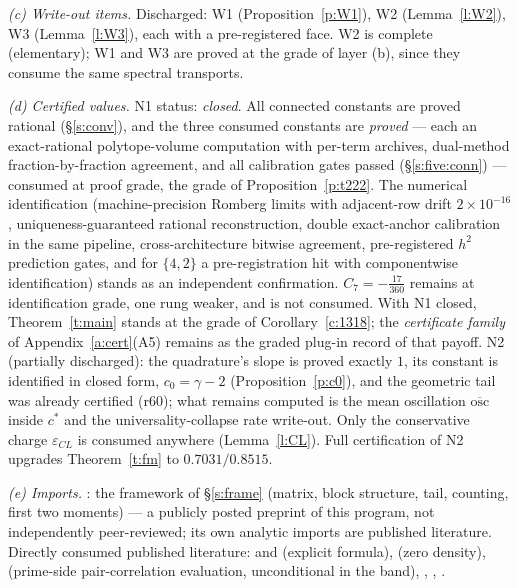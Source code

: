 \documentclass[11pt]{article}
\numberwithin{equation}{section}
\theoremstyle{definition}
\theoremstyle{remark}
\begin{document}
\emph{(c) Write-out items.} Discharged:
W1 (Proposition~\ref{p:W1}), W2 (Lemma~\ref{l:W2}), W3
(Lemma~\ref{l:W3}), each with a pre-registered face. W2 is
complete (elementary); W1 and W3 are proved at the grade of
layer (b), since they consume the same spectral transports.

\emph{(d) Certified values.} N1 status: \emph{closed}. All
connected constants are proved rational (\S\ref{s:conv}), and
the three consumed constants are \emph{proved} --- each an
exact-rational polytope-volume computation with per-term
archives, dual-method fraction-by-fraction agreement, and all
calibration gates passed (\S\ref{s:five:conn}) --- consumed
at proof grade, the grade of Proposition~\ref{p:t222}. The
numerical identification (machine-precision Romberg limits
with adjacent-row drift $2\times10^{-16}$,
uniqueness-guaranteed rational reconstruction, double
exact-anchor calibration in the same pipeline,
cross-architecture bitwise agreement, pre-registered $h^{2}$
prediction gates, and for $\{4,2\}$ a pre-registration hit
with componentwise identification) stands as an independent
confirmation.
$C_7=-\tfrac{17}{360}$ remains at identification grade, one
rung weaker, and is not consumed. With N1 closed,
Theorem~\ref{t:main} stands at the grade of
Corollary~\ref{c:1318}; the \emph{certificate family} of
Appendix~\ref{a:cert}(A5) remains as the graded plug-in
record of that payoff. N2
(partially discharged): the quadrature's slope
is proved exactly $1$, its constant is identified in closed form,
$c_0=\gamma-2$ (Proposition~\ref{p:c0}), and the geometric tail
was already certified (r60); what remains computed is the mean
oscillation $\overline{\mathrm{osc}}$ inside $c^{*}$ and the
universality-collapse rate write-out. Only the conservative
charge $\varepsilon_{CL}$ is consumed anywhere
(Lemma~\ref{l:CL}). Full certification of N2 upgrades
Theorem~\ref{t:fm} to $0.7031/0.8515$.

\emph{(e) Imports.} \cite{C26}: the framework of
\S\ref{s:frame} (matrix, block structure, tail, counting,
first two moments) --- a publicly posted preprint of this
program, not independently peer-reviewed; its own analytic
imports are published literature. Directly consumed published
literature: \cite{Wei52} and \cite[Thm.~5.12]{IK} (explicit
formula), \cite[Thm.~9.2]{Tit86} (zero density),
\cite{Mon73,BGST} (prime-side pair-correlation evaluation,
unconditional in the band), \cite{MRT}, \cite{HR},
\cite{Dav}.
\end{document}
